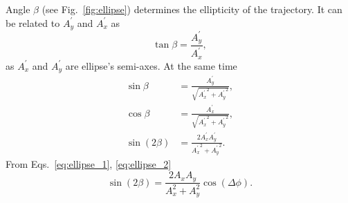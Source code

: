 Angle $\beta$ (see Fig.~\ref{fig:ellipse}) determines the ellipticity of the trajectory.
It can be related to $A_y^\prime$ and $A_x^\prime$ as 
\begin{equation}
    \tan\beta = \frac{A_y^\prime}{A_x^\prime},
\end{equation}
as $A_x^\prime$ and $A_y^\prime$ are ellipse's semi-axes.
At the same time 
\begin{equation}
    \begin{aligned}
        \label{eq:ellipt_angle}
        \sin \beta & = \frac{A_y^\prime}{\sqrt{{A_x^\prime}^2 + {A_y^\prime}^2}}, \\
        \cos \beta & = \frac{A_x^\prime}{\sqrt{{A_x^\prime}^2 + {A_y^\prime}^2}}, \\
        \sin (2\beta) & =  \frac{2 A_x^\prime A_y^\prime}{{A_x^\prime}^2 + {A_y^\prime}^2}.
    \end{aligned}
\end{equation}
From Eqs.~\ref{eq:ellipse_1}, \ref{eq:ellipse_2}
\begin{equation}
    \sin(2\beta) = \frac{2 A_x A_y}{A_x^2 + A_y^2} \cos (\Delta \phi).
\end{equation}

